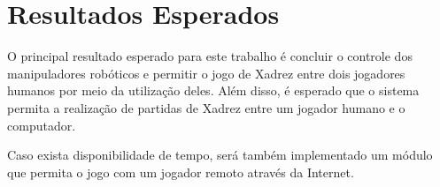 \chapter[Resultados Esperados]{Resultados Esperados}
\label{cap:resultados_esperados}

O principal resultado esperado para este trabalho é concluir o controle dos manipuladores robóticos e permitir o jogo de Xadrez entre dois jogadores humanos por meio da utilização deles.
Além disso, é esperado que o sistema permita a realização de partidas de Xadrez entre um jogador humano e o computador.

Caso exista disponibilidade de tempo, será também implementado um módulo que permita o jogo com um jogador remoto através da Internet.